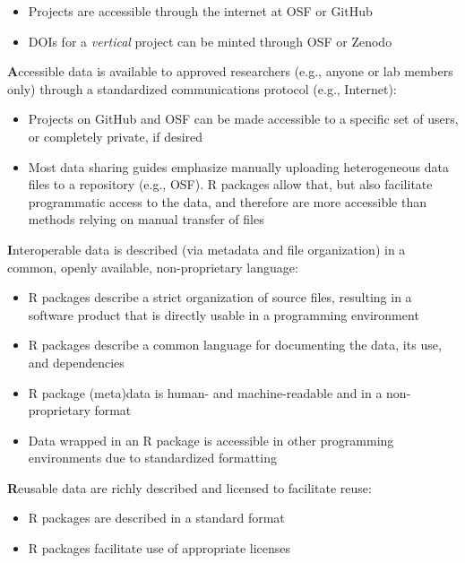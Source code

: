 \documentclass[
  english,
  jou,floatsintext]{apa6}
\providecommand{\tightlist}{%
  \setlength{\itemsep}{0pt}\setlength{\parskip}{0pt}}
\begin{document}
\begin{itemize}
\tightlist
\item
  Projects are accessible through the internet at OSF or GitHub
\item
  DOIs for a \emph{vertical} project can be minted through OSF or Zenodo
\end{itemize}

\textbf{A}ccessible data is available to approved researchers (e.g., anyone or lab members only) through a standardized communications protocol (e.g., Internet):

\begin{itemize}
\tightlist
\item
  Projects on GitHub and OSF can be made accessible to a specific set of users, or completely private, if desired
\item
  Most data sharing guides emphasize manually uploading heterogeneous data files to a repository (e.g., OSF). R packages allow that, but also facilitate programmatic access to the data, and therefore are more accessible than methods relying on manual transfer of files
\end{itemize}

\textbf{I}nteroperable data is described (via metadata and file organization) in a common, openly available, non-proprietary language:

\begin{itemize}
\tightlist
\item
  R packages describe a strict organization of source files, resulting in a software product that is directly usable in a programming environment
\item
  R packages describe a common language for documenting the data, its use, and dependencies
\item
  R package (meta)data is human- and machine-readable and in a non-proprietary format
\item
  Data wrapped in an R package is accessible in other programming environments due to standardized formatting
\end{itemize}

\textbf{R}eusable data are richly described and licensed to facilitate reuse:

\begin{itemize}
\tightlist
\item
  R packages are described in a standard format
\item
  R packages facilitate use of appropriate licenses
\end{itemize}
\end{document}
